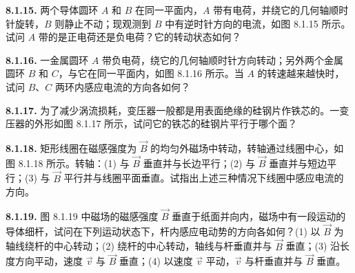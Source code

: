 \vfill
\newpage

\textbf{8.1.15.} 两个导体圆环 $A$ 和 $B$ 在同一平面内，$A$ 带有电荷，并绕它的几何轴顺时针旋转，$B$ 则静止不动；现观测到 $B$ 中有逆时针方向的电流，如图 8.1.15 所示。试问 $A$ 带的是正电荷还是负电荷？它的转动状态如何？

\begin{center}
\end{center}

\vfill
\newpage

\textbf{8.1.16.} 一金属圆环 $A$ 带负电荷，绕它的几何轴顺时针方向转动；另外两个金属圆环 $B$ 和 $C$，与它在同一平面内，如图 8.1.16 所示。当 $A$ 的转速越来越快时，试问 $B$、$C$ 两环内感应电流的方向各如何？

\begin{center}
\end{center}

\vfill
\newpage

\textbf{8.1.17.} 为了减少涡流损耗，变压器一般都是用表面绝缘的硅钢片作铁芯的。一变压器的外形如图 8.1.17 所示，试问它的铁芯的硅钢片平行于哪个面？

\begin{center}
\end{center}

\vfill
\newpage

\textbf{8.1.18.} 矩形线圈在磁感强度为 $\vec{B}$ 的均匀外磁场中转动，转轴通过线圈中心，如图 8.1.18 所示。转轴：(1) 与 $\vec{B}$ 垂直并与长边平行；(2) 与 $\vec{B}$ 垂直并与短边平行；(3) 与 $\vec{B}$ 平行并与线圈平面垂直。试指出上述三种情况下线圈中感应电流的方向。

\begin{center}
\end{center}

\begin{center}
\end{center}

\begin{center}
\end{center}

\vfill
\newpage

\textbf{8.1.19.} 图 8.1.19 中磁场的磁感强度 $\vec{B}$ 垂直于纸面并向内，磁场中有一段运动的导体细杆，试问在下列运动状态下，杆内感应电动势的方向各如何？(1) 以 $\vec{B}$ 为轴线绕杆的中心转动；(2) 绕杆的中心转动，轴线与杆垂直并与 $\vec{B}$ 垂直；(3) 沿长度方向平动，速度 $\vec{v}$ 与 $\vec{B}$ 垂直；(4) 以速度 $\vec{v}$ 平动，$\vec{v}$ 与杆垂直并与 $\vec{B}$ 垂直。

